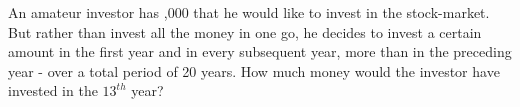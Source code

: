 
%
%
%
%
% 
\question[4]  An amateur investor has ,000 that he would like to invest in the
stock-market. But rather than invest all the money in one go, he decides to invest 
a certain amount in the first year and in every subsequent year,  more than
in the preceding year - over a total period of 20 years. How much money would the investor 
have invested in the $13^{th}$ year?


\ifprintanswers
\fi 

